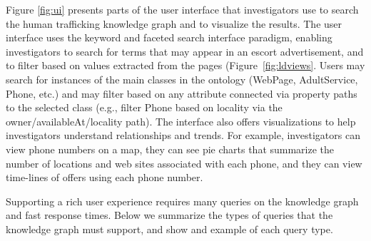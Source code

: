 Figure \ref{fig:ui} presents parts of the user interface that investigators use to search the human trafficking knowledge graph and to visualize the results.
The user interface uses the keyword and faceted search interface paradigm, enabling investigators to search for terms that may appear in an escort advertisement, and to filter based on values extracted from the pages (Figure~\ref{fig:ldviews}.
Users may search for instances of the main classes in the ontology (WebPage, AdultService, Phone, etc.) and may filter based on any attribute connected via property paths to the selected class (e.g., filter Phone based on locality via the owner/availableAt/locality path).
The interface also offers visualizations to help investigators understand relationships and trends.
For example, investigators can view phone numbers on a map, they can see pie charts that summarize the number of locations and web sites associated with each phone, and they can view time-lines of offers using each phone number.

Supporting a rich user experience requires many queries on the knowledge graph and fast response times.
Below we summarize the types of queries that the knowledge graph must support, and show and example of each query type.